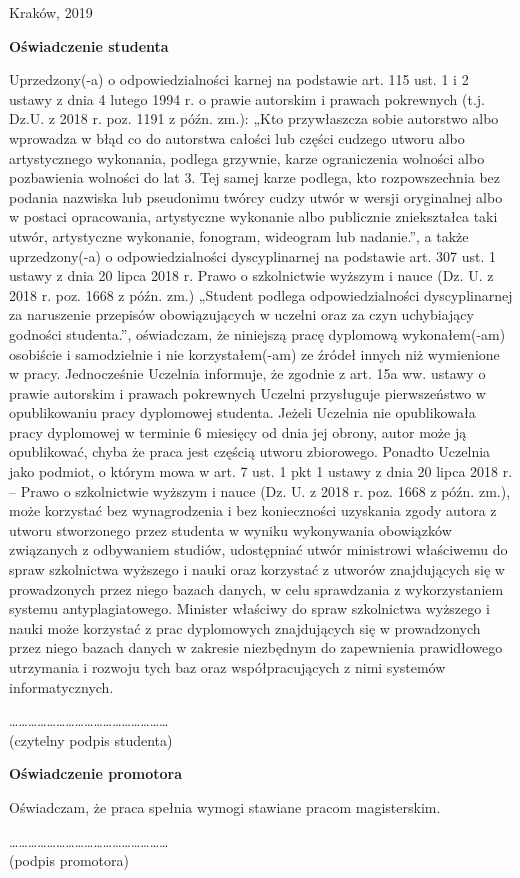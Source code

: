 \documentclass[12pt,a4paper,titlepage]{article}
\begin{document}
\begin{center}
Kraków, 2019
\end{center}
\newpage

\begin{center}
\textbf{Oświadczenie studenta}
\end{center}
Uprzedzony(-a) o odpowiedzialności karnej na podstawie art. 115 ust. 1 i 2 ustawy z dnia
4 lutego 1994 r. o prawie autorskim i prawach pokrewnych (t.j. Dz.U. z 2018 r. poz.
1191 z późn. zm.): „Kto przywłaszcza sobie autorstwo albo wprowadza w błąd co do
autorstwa całości lub części cudzego utworu albo artystycznego wykonania, podlega
grzywnie, karze ograniczenia wolności albo pozbawienia wolności do lat 3. Tej samej
karze podlega, kto rozpowszechnia bez podania nazwiska lub pseudonimu twórcy cudzy
utwór w wersji oryginalnej albo w postaci opracowania, artystyczne wykonanie albo
publicznie zniekształca taki utwór, artystyczne wykonanie, fonogram, wideogram lub
nadanie.”, a także uprzedzony(-a) o odpowiedzialności dyscyplinarnej na podstawie art.
307 ust. 1 ustawy z dnia 20 lipca 2018 r. Prawo o szkolnictwie wyższym i nauce (Dz. U.
z 2018 r. poz. 1668 z późn. zm.) „Student podlega odpowiedzialności dyscyplinarnej za
naruszenie przepisów obowiązujących w uczelni oraz za czyn uchybiający godności
studenta.”, oświadczam, że niniejszą pracę dyplomową wykonałem(-am) osobiście
i samodzielnie i nie korzystałem(-am) ze źródeł innych niż wymienione w pracy.
Jednocześnie Uczelnia informuje, że zgodnie z art. 15a ww. ustawy o prawie autorskim
i prawach pokrewnych Uczelni przysługuje pierwszeństwo w opublikowaniu pracy
dyplomowej studenta. Jeżeli Uczelnia nie opublikowała pracy dyplomowej w terminie
6 miesięcy od dnia jej obrony, autor może ją opublikować, chyba że praca jest częścią
utworu zbiorowego. Ponadto Uczelnia jako podmiot, o którym mowa w art. 7 ust. 1 pkt 1
ustawy z dnia 20 lipca 2018 r. – Prawo o szkolnictwie wyższym i nauce (Dz. U. z 2018 r.
poz. 1668 z późn. zm.), może korzystać bez wynagrodzenia i bez konieczności uzyskania
zgody autora z utworu stworzonego przez studenta w wyniku wykonywania obowiązków
związanych z odbywaniem studiów, udostępniać utwór ministrowi właściwemu do spraw
szkolnictwa wyższego i nauki oraz korzystać z utworów znajdujących się w prowadzonych
przez niego bazach danych, w celu sprawdzania z wykorzystaniem systemu
antyplagiatowego. Minister właściwy do spraw szkolnictwa wyższego i nauki może
korzystać z prac dyplomowych znajdujących się w prowadzonych przez niego bazach
danych w zakresie niezbędnym do zapewnienia prawidłowego utrzymania i rozwoju tych
baz oraz współpracujących z nimi systemów informatycznych.\\
\begin{flushright}
……………………………………………\\
(czytelny podpis studenta)
\end{flushright}
\begin{center}
\textbf{Oświadczenie promotora}
\end{center}
Oświadczam, że praca spełnia wymogi stawiane pracom magisterskim.
\begin{flushright}
……………………………………………\\
(podpis promotora)
\end{flushright}
\newpage
\end{document}
